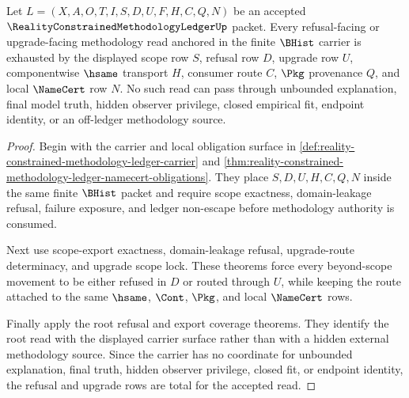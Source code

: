 \begin{theorem}
\label{thm:reality-constrained-methodology-ledger-refusal-upgrade-totality}
Let $L=(X,A,O,T,I,S,D,U,F,H,C,Q,N)$ be an accepted
$\RealityConstrainedMethodologyLedgerUp$ packet. Every refusal-facing or
upgrade-facing methodology read anchored in the finite $\BHist$ carrier is
exhausted by the displayed scope row $S$, refusal row $D$, upgrade row $U$,
componentwise $\hsame$ transport $H$, consumer route $C$, $\Pkg$ provenance
$Q$, and local $\NameCert$ row $N$. No such read can pass through unbounded
explanation, final model truth, hidden observer privilege, closed empirical
fit, endpoint identity, or an off-ledger methodology source.
\end{theorem}
\begin{proof}
Begin with the carrier and local obligation surface in
\autoref{def:reality-constrained-methodology-ledger-carrier} and
\autoref{thm:reality-constrained-methodology-ledger-namecert-obligations}. They
place $S,D,U,H,C,Q,N$ inside the same finite $\BHist$ packet and require scope
exactness, domain-leakage refusal, failure exposure, and ledger non-escape
before methodology authority is consumed.

Next use scope-export exactness, domain-leakage refusal, upgrade-route
determinacy, and upgrade scope lock. These theorems force every beyond-scope
movement to be either refused in $D$ or routed through $U$, while keeping the
route attached to the same $\hsame$, $\Cont$, $\Pkg$, and local $\NameCert$
rows.

Finally apply the root refusal and export coverage theorems. They identify the
root read with the displayed carrier surface rather than with a hidden external
methodology source. Since the carrier has no coordinate for unbounded
explanation, final truth, hidden observer privilege, closed fit, or endpoint
identity, the refusal and upgrade rows are total for the accepted read.
\end{proof}

